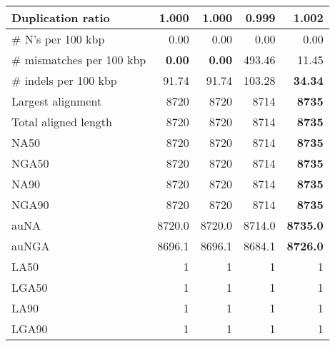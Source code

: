 \documentclass[12pt,a4paper]{article}
\begin{document}
\begin{table}[ht]
\begin{center}
\begin{tabular}{|l*{4}{|r}|}
Duplication ratio & 1.000 & 1.000 & {\bf 0.999} & 1.002 \\ \hline
\# N's per 100 kbp & 0.00 & 0.00 & 0.00 & 0.00 \\ \hline
\# mismatches per 100 kbp & {\bf 0.00} & {\bf 0.00} & 493.46 & 11.45 \\ \hline
\# indels per 100 kbp & 91.74 & 91.74 & 103.28 & {\bf 34.34} \\ \hline
Largest alignment & 8720 & 8720 & 8714 & {\bf 8735} \\ \hline
Total aligned length & 8720 & 8720 & 8714 & {\bf 8735} \\ \hline
NA50 & 8720 & 8720 & 8714 & {\bf 8735} \\ \hline
NGA50 & 8720 & 8720 & 8714 & {\bf 8735} \\ \hline
NA90 & 8720 & 8720 & 8714 & {\bf 8735} \\ \hline
NGA90 & 8720 & 8720 & 8714 & {\bf 8735} \\ \hline
auNA & 8720.0 & 8720.0 & 8714.0 & {\bf 8735.0} \\ \hline
auNGA & 8696.1 & 8696.1 & 8684.1 & {\bf 8726.0} \\ \hline
LA50 & 1 & 1 & 1 & 1 \\ \hline
LGA50 & 1 & 1 & 1 & 1 \\ \hline
LA90 & 1 & 1 & 1 & 1 \\ \hline
LGA90 & 1 & 1 & 1 & 1 \\ \hline
\end{tabular}
\end{center}
\end{table}
\end{document}
